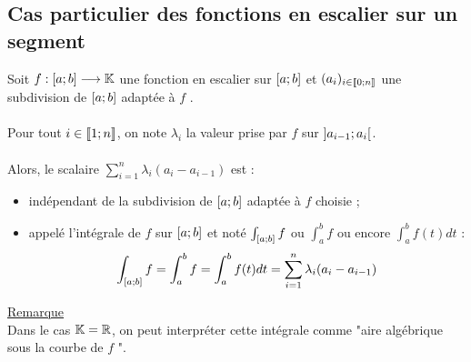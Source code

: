 \subsection{Cas particulier des fonctions en escalier sur un segment}
\begin{defprop}
    Soit \(f : \left[a;b\right] \longrightarrow \mathbb{K}\) une fonction en escalier sur \(\left[a;b\right]\) et \((a_i)_{i\in \left\llbracket0;n\right\rrbracket}\) une subdivision de \(\left[a;b\right]\) adaptée à \(f\) .\\~\\
    Pour tout \(i \in  \left\llbracket1;n\right\rrbracket\), on note \(\lambda_i\) la valeur prise par \(f\) sur \(\left]a_{i-1};a_i\right[\).\\~\\
    Alors, le scalaire \(\sum^n_{i=1}\lambda_i (a_i -  a_{i- 1})\) est :
    \begin{itemize}
        \item indépendant de la subdivision de \(\left[a;b\right]\) adaptée à \(f\) choisie ;
        \item appelé l’intégrale de \(f\) sur \(\left[a;b\right]\) et noté \(\int_{\left[a;b\right]} f\) ou \(\int^b_a f\) ou encore \(\int^b_a f (t)dt\) :
        \[\int_{\left[a;b\right]} f =\int^b_a f =\int^b_a f (t)dt = \sum^n_{i=1} \lambda_i (a_i -  a_{i- 1})\]
    \end{itemize}
    \underline{Remarque}\\
    Dans le cas \(\mathbb{K} = \mathbb{R}\), on peut interpréter cette intégrale comme "aire algébrique sous la courbe de \(f\) ".
\end{defprop}
